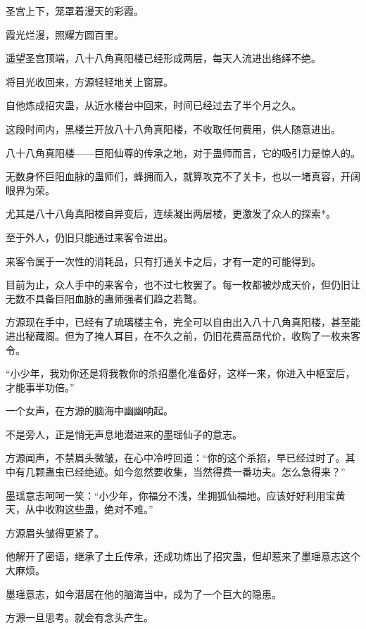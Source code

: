 
\begin{this_body}

圣宫上下，笼罩着漫天的彩霞。

霞光烂漫，照耀方圆百里。

遥望圣宫顶端，八十八角真阳楼已经形成两层，每天人流进出络绎不绝。

将目光收回来，方源轻轻地关上窗扉。

自他炼成招灾蛊，从近水楼台中回来，时间已经过去了半个月之久。

这段时间内，黑楼兰开放八十八角真阳楼，不收取任何费用，供人随意进出。

八十八角真阳楼——巨阳仙尊的传承之地，对于蛊师而言，它的吸引力是惊人的。

无数身怀巨阳血脉的蛊师们，蜂拥而入，就算攻克不了关卡，也以一堵真容，开阔眼界为荣。

尤其是八十八角真阳楼自异变后，连续凝出两层楼，更激发了众人的探索*。

至于外人，仍旧只能通过来客令进出。

来客令属于一次性的消耗品，只有打通关卡之后，才有一定的可能得到。

目前为止，众人手中的来客令，也不过七枚罢了。每一枚都被炒成天价，但仍旧让无数不具备巨阳血脉的蛊师强者们趋之若鹜。

方源现在手中，已经有了琉璃楼主令，完全可以自由出入八十八角真阳楼，甚至能进出秘藏阁。但为了掩人耳目，在不久之前，仍旧花费高昂代价，收购了一枚来客令。

“小少年，我劝你还是将我教你的杀招墨化准备好，这样一来，你进入中枢室后，才能事半功倍。”

一个女声，在方源的脑海中幽幽响起。

不是旁人，正是悄无声息地潜进来的墨瑶仙子的意志。

方源闻声，不禁眉头微皱，在心中冷哼回道：“你的这个杀招，早已经过时了。其中有几颗蛊虫已经绝迹。如今忽然要收集，当然得费一番功夫。怎么急得来？”

墨瑶意志呵呵一笑：“小少年，你福分不浅，坐拥狐仙福地。应该好好利用宝黄天，从中收购这些蛊，绝对不难。”

方源眉头皱得更紧了。

他解开了密语，继承了土丘传承，还成功炼出了招灾蛊，但却惹来了墨瑶意志这个大麻烦。

墨瑶意志，如今潜居在他的脑海当中，成为了一个巨大的隐患。

方源一旦思考。就会有念头产生。


\end{this_body}
